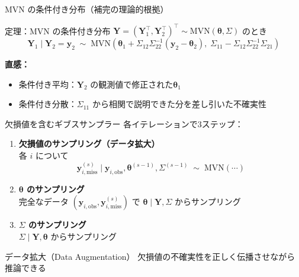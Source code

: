 \documentclass[lualatex,aspectratio=169,12pt]{beamer}
\newcommand{\mvn}{\mathrm{MVN}}
\begin{document}
\begin{frame}{MVN の条件付き分布（補完の理論的根拠）}
  \begin{block}{定理：MVN の条件付き分布}
    $\bm{Y} = (\bm{Y}_1^\top, \bm{Y}_2^\top)^\top \sim \mvn(\bm{\theta}, \Sigma)$ のとき
    \[
      \bm{Y}_1 \mid \bm{Y}_2 = \bm{y}_2 \;\sim\;
      \mvn\!\left(\bm{\theta}_1 + \Sigma_{12}\Sigma_{22}^{-1}(\bm{y}_2-\bm{\theta}_2),\;
      \Sigma_{11} - \Sigma_{12}\Sigma_{22}^{-1}\Sigma_{21}\right)
    \]
  \end{block}

  \bigskip
  \textbf{直感：}
  \begin{itemize}
    \item 条件付き平均：$\bm{Y}_2$ の観測値で\alert{修正された}$\bm{\theta}_1$
    \item 条件付き分散：$\Sigma_{11}$ から相関で説明できた分を\alert{差し引いた}不確実性
  \end{itemize}
\end{frame}

\begin{frame}{欠損値を含むギブスサンプラー}
  各イテレーションで3ステップ：

  \begin{enumerate}
    \item \textbf{欠損値のサンプリング（データ拡大）}\\
          各 $i$ について
          \[
            \bm{y}_{i,\text{miss}}^{(s)} \mid \bm{y}_{i,\text{obs}}, \bm{\theta}^{(s-1)}, \Sigma^{(s-1)}
            \;\sim\; \mvn(\cdots)
          \]

    \item \textbf{$\bm{\theta}$ のサンプリング}\\
          完全なデータ $(\bm{y}_{i,\text{obs}}, \bm{y}_{i,\text{miss}}^{(s)})$ で $\bm{\theta}\mid\bm{Y},\Sigma$ からサンプリング

    \item \textbf{$\Sigma$ のサンプリング}\\
          $\Sigma\mid\bm{Y},\bm{\theta}$ からサンプリング
  \end{enumerate}

  \begin{block}{データ拡大（Data Augmentation）}
    欠損値の不確実性を正しく伝播させながら推論できる
  \end{block}
\end{frame}
\end{document}
